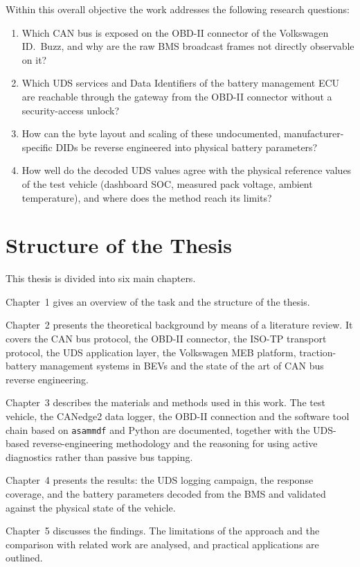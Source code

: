 \documentclass[11pt,a4paper,oneside,parskip=half]{scrreprt}
\begin{document}
Within this overall objective the work addresses the following research questions:

\begin{enumerate}
  \item Which CAN bus is exposed on the OBD-II connector of the Volkswagen ID.~Buzz, and why are the raw BMS broadcast frames not directly observable on it?
  \item Which UDS services and Data Identifiers of the battery management ECU are reachable through the gateway from the OBD-II connector without a security-access unlock?
  \item How can the byte layout and scaling of these undocumented, manufacturer-specific DIDs be reverse engineered into physical battery parameters?
  \item How well do the decoded UDS values agree with the physical reference values of the test vehicle (dashboard SOC, measured pack voltage, ambient temperature), and where does the method reach its limits?
\end{enumerate}

\section{Structure of the Thesis}
This thesis is divided into six main chapters.

Chapter~1 gives an overview of the task and the structure of the thesis.

Chapter~2 presents the theoretical background by means of a literature review. It covers the CAN bus protocol, the OBD-II connector, the ISO-TP transport protocol, the UDS application layer, the Volkswagen MEB platform, traction-battery management systems in BEVs and the state of the art of CAN bus reverse engineering.

Chapter~3 describes the materials and methods used in this work. The test vehicle, the CANedge2 data logger, the OBD-II connection and the software tool chain based on \texttt{asammdf} and Python are documented, together with the UDS-based reverse-engineering methodology and the reasoning for using active diagnostics rather than passive bus tapping.

Chapter~4 presents the results: the UDS logging campaign, the response coverage, and the battery parameters decoded from the BMS and validated against the physical state of the vehicle.

Chapter~5 discusses the findings. The limitations of the approach and the comparison with related work are analysed, and practical applications are outlined.
\end{document}
